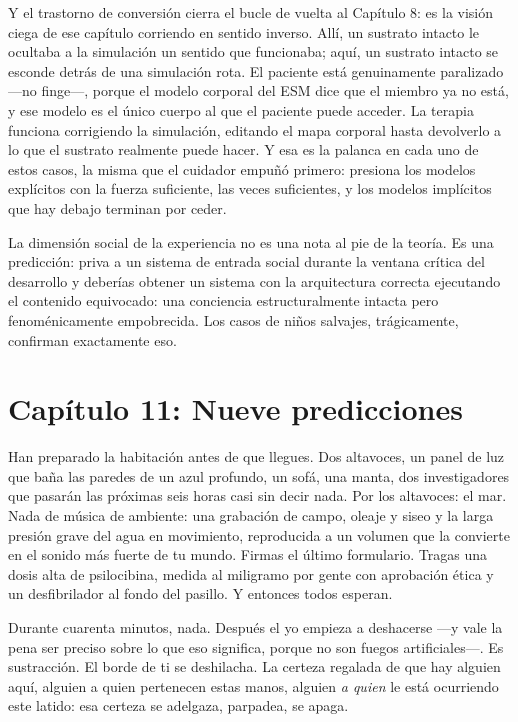 \documentclass[11pt, twoside, openright]{book}
\begin{document}
Y el trastorno de conversión cierra el bucle de vuelta al Capítulo 8: es la visión ciega de ese capítulo corriendo en sentido inverso. Allí, un sustrato intacto le ocultaba a la simulación un sentido que funcionaba; aquí, un sustrato intacto se esconde detrás de una simulación rota. El paciente está genuinamente paralizado ---no finge---, porque el modelo corporal del ESM dice que el miembro ya no está, y ese modelo es el único cuerpo al que el paciente puede acceder. La terapia funciona corrigiendo la simulación, editando el mapa corporal hasta devolverlo a lo que el sustrato realmente puede hacer. Y esa es la palanca en cada uno de estos casos, la misma que el cuidador empuñó primero: presiona los modelos explícitos con la fuerza suficiente, las veces suficientes, y los modelos implícitos que hay debajo terminan por ceder.

La dimensión social de la experiencia no es una nota al pie de la teoría. Es una predicción: priva a un sistema de entrada social durante la ventana crítica del desarrollo y deberías obtener un sistema con la arquitectura correcta ejecutando el contenido equivocado: una conciencia estructuralmente intacta pero fenoménicamente empobrecida. Los casos de niños salvajes, trágicamente, confirman exactamente eso.


\chapter*{Capítulo 11: Nueve predicciones}

Han preparado la habitación antes de que llegues. Dos altavoces, un panel de luz que baña las paredes de un azul profundo, un sofá, una manta, dos investigadores que pasarán las próximas seis horas casi sin decir nada. Por los altavoces: el mar. Nada de música de ambiente: una grabación de campo, oleaje y siseo y la larga presión grave del agua en movimiento, reproducida a un volumen que la convierte en el sonido más fuerte de tu mundo. Firmas el último formulario. Tragas una dosis alta de psilocibina, medida al miligramo por gente con aprobación ética y un desfibrilador al fondo del pasillo. Y entonces todos esperan.

Durante cuarenta minutos, nada. Después el yo empieza a deshacerse ---y vale la pena ser preciso sobre lo que eso significa, porque no son fuegos artificiales---. Es sustracción. El borde de ti se deshilacha. La certeza regalada de que hay alguien aquí, alguien a quien pertenecen estas manos, alguien \textit{a quien} le está ocurriendo este latido: esa certeza se adelgaza, parpadea, se apaga.
\end{document}

